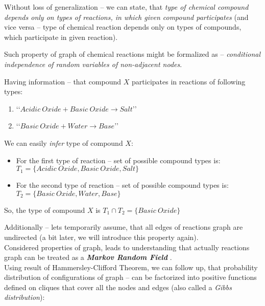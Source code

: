 \documentclass[10pt]{article}
\begin{document}
Without loss of generalization -- we can state, that \emph{type of chemical compound depends only on types of reactions, in which given compound participates} (and vice versa -- type of chemical reaction depends only on types of compounds, which participate in given reaction).  

Such property of graph of chemical reactions might be formalized as -- \emph{conditional independence of random variables of non-adjacent nodes}.

\begin{tcolorbox}[colback=gray!5,colframe=gray!70,title=Example,left=7pt, right=7pt]

Having information -- that compound $X$ participates in reactions of following types:
\begin{enumerate}
    \item \lq \lq $Acidic\ Oxide + Basic\ Oxide \rightarrow Salt$\rq \rq
    \item \lq \lq $Basic\ Oxide + Water \rightarrow Base$\rq \rq
\end{enumerate}
We can easily \emph{infer} type of compound $X$: 
\begin{itemize}
    \item For the first type of reaction -- set of possible compound types is: \\
             $T_1 = \{Acidic\ Oxide, Basic\ Oxide, Salt\}$
    \item For the second type of reaction -- set of possible compound types is: \\
             $T_2 = \{Basic\ Oxide, Water, Base\}$
\end{itemize}
So, the type of compound $X$ is $T_1 \cap T_2 = \{Basic\ Oxide\}$

\end{tcolorbox}

Additionally -- lets temporarily assume, that all edges of reactions graph are undirected (a bit later, we will introduce this property again). \\

Considered properties of graph, leads to understanding that actually reactions graph can be treated as a \emph{\textbf{Markov Random Field}} \cite{wikipedia_mrf}.
\\

Using result of Hammersley-Clifford Theorem, we can follow up, that probability distribution of configurations of graph -- can be factorized into positive functions defined on cliques that cover all the nodes and edges (also called a \emph{Gibbs distribution})\cite{hammersley_clifford_proof, wikipedia_hammersley_clifford}:
\end{document}
